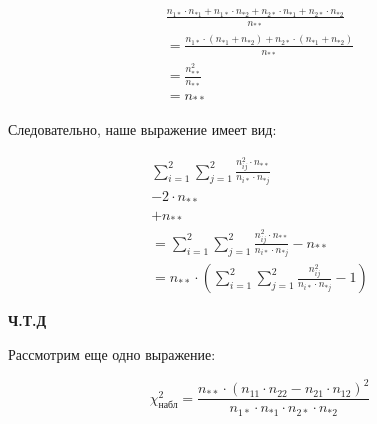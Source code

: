 \documentclass{article}
\begin{document}
    \quad

    \[
    \begin{gathered}
        \frac{n_{1*} \cdot n_{*1} + n_{1*} \cdot n_{*2} + n_{2*} \cdot n_{*1} + n_{2*} \cdot n_{*2}}{ n_{**}} \\
         = \frac{n_{1*} \cdot (n_{*1} + n_{*2}) + n_{2*} \cdot (n_{*1} + n_{*2})}{ n_{**}} \\
         = \frac{n_{**}^{2}}{n_{**}} \\
         = n_{**}
    \end{gathered}
    \]

    \quad

    Следовательно, наше выражение имеет вид:

    \quad

    \[
    \begin{gathered}
        \sum_{i=1}^{2}{\sum_{j=1}^{2}{  \frac{n_{ij}^{2} \cdot n_{**}}{ n_{i*} \cdot n_{*j} }  }} \\
         - 2 \cdot n_{**} \\
         + n_{**} \\
         = \sum_{i=1}^{2}{\sum_{j=1}^{2}{  \frac{n_{ij}^{2} \cdot n_{**}}{ n_{i*} \cdot n_{*j} }  }} - n_{**} \\
         = n_{**} \cdot (\sum_{i=1}^{2}{\sum_{j=1}^{2}{  \frac{n_{ij}^{2} }{ n_{i*} \cdot n_{*j} }  }} - 1)
    \end{gathered}
    \]
    
    \textbf{Ч.Т.Д}


    Рассмотрим еще одно выражение:

    \begin{equation}
        \chi^{2}_{\text{набл}} = \frac{n_{**} \cdot (n_{11}
        \cdot n_{22} - n_{21} \cdot n_{12})^{2}}{n_{1*} \cdot n_{*1} \cdot n_{2*} \cdot n_{*2}}
    \end{equation}
\end{document}
